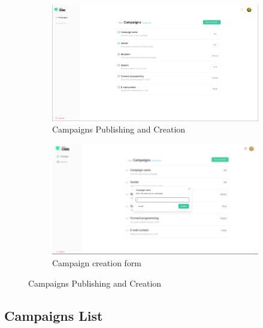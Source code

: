 \begin{figure}[ht]
	\centering
	\begin{subfigure}[b]{0.45\linewidth}
		\includegraphics[width=\linewidth]{Images/Sprint1/screenshots/Screenshot 2024-05-26 214028.png}
		\caption{Campaigns Publishing and Creation}
		\label{fig:Campaigns Publishing and Creation}
	\end{subfigure}
	\hfill
	\begin{subfigure}[b]{0.45\linewidth}
		\includegraphics[width=\linewidth]{Images/Sprint1/screenshots/Screenshot 2024-06-03 202916.png}
		\caption{Campaign creation form}
		\label{fig:Campaign creation form}
	\end{subfigure}
	\caption{Campaigns Publishing and Creation}
\end{figure}


\subsection{Campaigns List}

